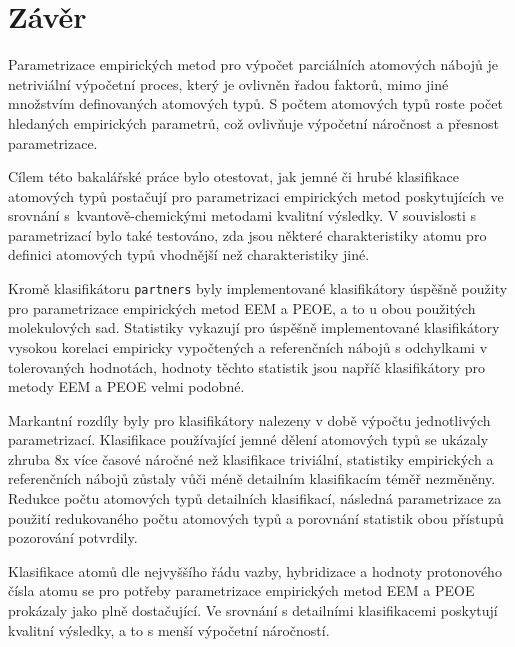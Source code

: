 \chapter{Závěr}
Parametrizace empirických metod pro výpočet parciálních atomových nábojů je netriviální výpočetní proces, který je ovlivněn řadou faktorů, mimo jiné množstvím definovaných atomových typů. S počtem atomových typů roste počet hledaných empirických parametrů, což ovlivňuje výpočetní náročnost a přesnost parametrizace.

Cílem této bakalářské práce bylo otestovat, jak jemné či hrubé klasifikace atomových typů postačují pro parametrizaci empirických metod poskytujících ve srovnání s~kvantově-chemickými metodami kvalitní výsledky. V souvislosti s parametrizací bylo také testováno, zda jsou některé charakteristiky atomu pro definici atomových typů vhodnější než charakteristiky jiné.


Kromě klasifikátoru \verb|partners| byly implementované klasifikátory úspěšně použity pro parametrizace empirických metod EEM a PEOE, a to u obou použitých molekulových sad. Statistiky  vykazují pro úspěšně implementované klasifikátory vysokou korelaci empiricky vypočtených a referenčních nábojů s odchylkami v tolerovaných hodnotách, hodnoty těchto statistik jsou napříč klasifikátory pro metody EEM a PEOE velmi podobné. 

Markantní rozdíly byly pro klasifikátory nalezeny v době výpočtu jednotlivých parametrizací. Klasifikace používající jemné dělení atomových typů se ukázaly zhruba 8x více časové náročné než klasifikace triviální, statistiky empirických a referenčních nábojů zůstaly vůči méně detailním klasifikacím téměř nezměněny. Redukce počtu atomových typů detailních klasifikací, následná parametrizace za použití redukovaného počtu atomových typů a porovnání statistik obou přístupů pozorování potvrdily.
 
Klasifikace atomů dle nejvyššího řádu vazby, hybridizace a hodnoty protonového čísla atomu se pro potřeby parametrizace empirických metod EEM a PEOE prokázaly jako plně dostačující. Ve srovnání s detailními klasifikacemi poskytují kvalitní výsledky, a to s menší výpočetní náročností.






